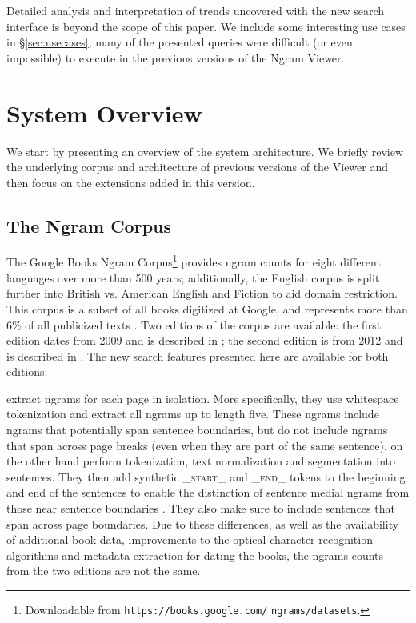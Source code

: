 \documentclass[11pt]{article}
\begin{document}
Detailed analysis and interpretation of trends uncovered with the new search interface is beyond the scope of this paper. We include some interesting use cases in \S\ref{sec:usecases}; many of the presented queries were difficult (or even impossible) to execute in the previous versions of the Ngram Viewer.

\section{System Overview}
\label{sec:overview}

We start by presenting an overview of the system architecture. We briefly review the underlying corpus and architecture of previous versions of the Viewer \cite{culturomics,lin2012syntactic} and then focus on the extensions added in this version.


\subsection{The Ngram Corpus}
	The Google Books Ngram Corpus\footnote{Downloadable from \texttt{https://books.google.com/} \texttt{ngrams/datasets}.} provides ngram counts for eight different languages over more than 500 years; additionally, the English corpus is split further into British vs. American English and Fiction to aid domain restriction. This corpus is a subset of all books digitized at Google, and represents more than 6\% of all publicized texts \cite{lin2012syntactic}. Two editions of the corpus are available: the first edition dates from 2009 and is described in ; the second edition is from 2012 and is described in . The new search features presented here are available for both editions.

 extract ngrams for each page in isolation. More specifically, they use whitespace tokenization and extract all ngrams up to length five. These ngrams include ngrams that potentially span sentence boundaries, but do not include ngrams that span across page breaks (even when they are part of the same sentence).
 on the other hand perform tokenization, text normalization and segmentation into sentences. They then add synthetic \textsf{\textsc{\_start\_}} and \textsf{\textsc{\_end\_}} tokens to the beginning and end of the sentences to enable the distinction of sentence medial ngrams from those near sentence boundaries \cite{lin2012syntactic}. They also make sure to include sentences that span across page boundaries. Due to these differences, as well as the availability of additional book data, improvements to the optical character recognition algorithms and metadata extraction for dating the books, the ngrams counts from the two editions are not the same.
\end{document}
